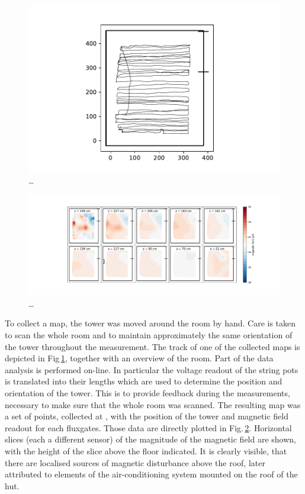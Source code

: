 \begin{figure}
  \centering
  \includegraphics[width=0.9\linewidth]{gfx/mapping/lpsc/bastille_crane_away_rep_track.pdf}
  \caption{\ldots}\label{fig:mapping_bastille_track}
\end{figure}

\begin{figure}
  \centering
  \includegraphics[width=\linewidth]{gfx/mapping/lpsc/bastille_crane_away_rep_magnitude.pdf}
  \caption{\ldots}\label{fig:mapping_bastille_magnitude}
\end{figure}

To collect a map, the tower was moved around the room by hand. Care is taken to scan the whole room and to maintain approximately the same orientation of the tower throughout the measurement. The track of one of the collected maps is depicted in Fig\,\ref{fig:mapping_bastille_track}, together with an overview of the room.  Part of the data analysis is performed on-line. In particular the voltage readout of the string pots is translated into their lengths which are used to determine the position and orientation of the tower. This is to provide feedback during the measurements, necessary to make sure that the whole room was scanned. The resulting map was a set of points, collected at , with the position of the tower and magnetic field readout for each fluxgates. Those data are directly plotted in Fig.\,\ref{fig:mapping_bastille_magnitude}. Horizontal slices (each a different sensor) of the magnitude of the magnetic field are shown, with the height of the slice above the floor indicated. It is clearly visible, that there are localised sources of magnetic disturbance above the roof, later attributed to elements of the air-conditioning system mounted on the roof of the hut.

